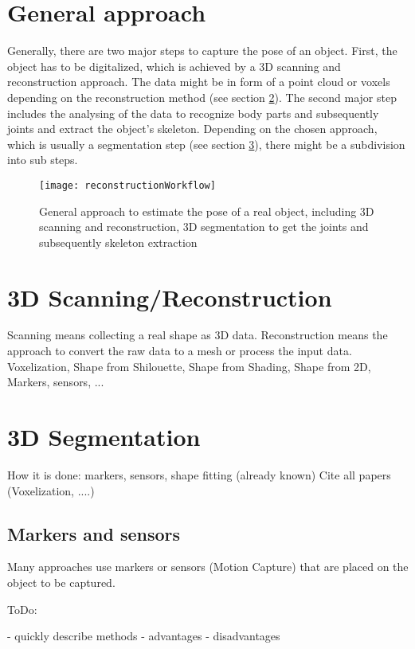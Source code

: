 \section{General approach}
Generally, there are two major steps to capture the pose of an object. First, the object has to be digitalized, which is achieved by a 3D scanning and reconstruction approach. The data might be in form of a point cloud or voxels depending on the reconstruction method (see section \ref{sec:reconstruction}). The second major step includes the analysing of the data to recognize body parts and subsequently joints and extract the object's skeleton. Depending on the chosen approach, which is usually a segmentation step (see section \ref{sec:segmentation}), there might be a subdivision into sub steps.
%
%
\begin{figure}
	\centering
	\texttt{[image: reconstructionWorkflow]}
	\caption{General approach to estimate the pose of a real object, including 3D scanning and reconstruction, 3D segmentation to get the joints and subsequently skeleton extraction}
	\label{fig:posecapture}
\end{figure}
%
\section{3D Scanning/Reconstruction}
\label{sec:reconstruction}

Scanning means collecting a real shape as 3D data. Reconstruction means the approach to convert the raw data to a mesh or process the input data.
Voxelization, Shape from Shilouette, Shape from Shading, Shape from 2D, Markers, sensors, ... 

\section{3D Segmentation}
\label{sec:segmentation}

How it is done: markers, sensors, shape fitting (already known)
Cite all papers (Voxelization, ....)

\subsection{Markers and sensors}
Many approaches use markers or sensors (Motion Capture) that are placed on the object to be captured. 

ToDo:

- quickly describe methods
- advantages
- disadvantages

